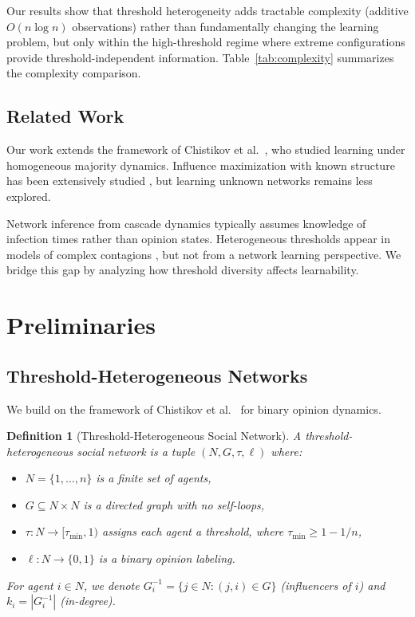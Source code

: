 \documentclass[conference]{IEEEtran}
\newtheorem{definition}{Definition}
\begin{document}
Our results show that threshold heterogeneity adds tractable complexity (additive $O(n \log n)$ observations) rather than fundamentally changing the learning problem, but only within the high-threshold regime where extreme configurations provide threshold-independent information. Table~\ref{tab:complexity} summarizes the complexity comparison.

\subsection{Related Work}

Our work extends the framework of Chistikov et al.~\cite{chistikov2020convergence}, who studied learning under homogeneous majority dynamics. Influence maximization with known structure has been extensively studied \cite{kempe2003maximizing,bredereck2017manipulating}, but learning unknown networks remains less explored.

Network inference from cascade dynamics \cite{netrapalli2012learning,gomez2010inferring} typically assumes knowledge of infection times rather than opinion states. Heterogeneous thresholds appear in models of complex contagions \cite{granovetter1978threshold}, but not from a network learning perspective. We bridge this gap by analyzing how threshold diversity affects learnability.

\section{Preliminaries}
\label{sec:preliminaries}

\subsection{Threshold-Heterogeneous Networks}

We build on the framework of Chistikov et al.~\cite{chistikov2020convergence} for binary opinion dynamics.

\begin{definition}[Threshold-Heterogeneous Social Network]
\label{def:threshold_network}
A threshold-heterogeneous social network is a tuple $(N, G, \tau, \ell)$ where:
\begin{itemize}
\item $N = \{1, \ldots, n\}$ is a finite set of agents,
\item $G \subseteq N \times N$ is a directed graph with no self-loops,
\item $\tau : N \to [\tau_{\min}, 1)$ assigns each agent a threshold, where $\tau_{\min} \geq 1 - 1/n$,
\item $\ell : N \to \{0, 1\}$ is a binary opinion labeling.
\end{itemize}
For agent $i \in N$, we denote $G^{-1}_i = \{j \in N : (j, i) \in G\}$ (influencers of $i$) and $k_i = |G^{-1}_i|$ (in-degree).
\end{definition}
\end{document}
